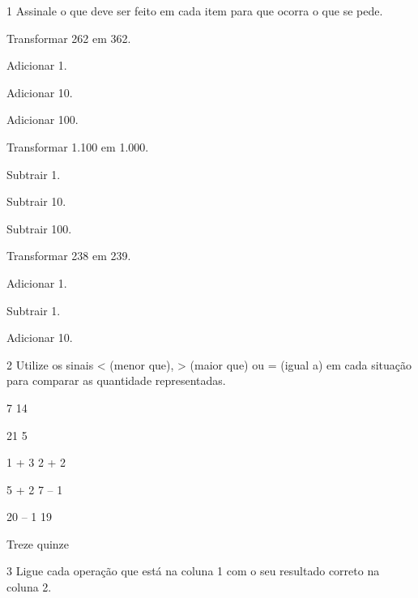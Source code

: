 
\num{1} Assinale o que deve ser feito em cada item para que ocorra o que se pede.

\begin{escolha}

\item
  Transformar 262 em 362.

\begin{boxlist}
\boxitem[] Adicionar 1.

\boxitem[] Adicionar 10.

\boxitem[]Adicionar 100.
\end{boxlist}

\item
  Transformar 1.100 em 1.000.

\begin{boxlist}
\boxitem[] Subtrair 1.

\boxitem[] Subtrair 10.

\boxitem[]Subtrair 100.
\end{boxlist}

\item
  Transformar 238 em 239.

\begin{boxlist}
\boxitem[] Adicionar 1.

\boxitem[] Subtrair 1.

\boxitem[]Adicionar 10.
\end{boxlist}

\end{escolha}

\num{2} Utilize os sinais \textless{} (menor que), \textgreater{} (maior que) ou
= (igual a) em cada situação para comparar as quantidade representadas.

\begin{escolha}
\item
  7  14
\item
  21  5
\item
  1 + 3  2 + 2
\item
  5 + 2  7 -- 1
\item
  20 -- 1  19
\item
  Treze  quinze
\end{escolha}

\num{3} Ligue cada operação que está na coluna 1 com o seu resultado correto na coluna 2.


